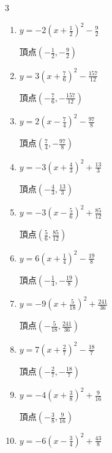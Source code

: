 \begin{multicols}{3}
\begin{enumerate}
        $\displaystyle 頂点\left( \frac{3}{10} , -\frac{29}{20} \right)$

  \item $\displaystyle y=-2\left( x+\frac{1}{2}\right)^{2}-\frac{9}{2}$

        $\displaystyle 頂点\left( -\frac{1}{2} , -\frac{9}{2} \right)$

  \item $\displaystyle y=3\left( x+\frac{7}{6}\right)^{2}-\frac{157}{12}$

        $\displaystyle 頂点\left( -\frac{7}{6} , -\frac{157}{12} \right)$

  \item $\displaystyle y=2\left( x-\frac{7}{4}\right)^{2}-\frac{97}{8}$

        $\displaystyle 頂点\left( \frac{7}{4} , -\frac{97}{8} \right)$

  \item $\displaystyle y=-3\left( x+\frac{4}{3}\right)^{2}+\frac{13}{3}$

        $\displaystyle 頂点\left( -\frac{4}{3} , \frac{13}{3} \right)$

\columnbreak %

  \item $\displaystyle y=-3\left( x-\frac{5}{6}\right)^{2}+\frac{85}{12}$

        $\displaystyle 頂点\left( \frac{5}{6} , \frac{85}{12} \right)$

  \item $\displaystyle y=6\left( x+\frac{1}{4}\right)^{2}-\frac{19}{8}$

        $\displaystyle 頂点\left( -\frac{1}{4} , -\frac{19}{8} \right)$

  \item $\displaystyle y=-9\left( x+\frac{5}{18}\right)^{2}+\frac{241}{36}$

        $\displaystyle 頂点\left( -\frac{5}{18} , \frac{241}{36} \right)$

  \item $\displaystyle y=7\left( x+\frac{2}{7}\right)^{2}-\frac{18}{7}$

        $\displaystyle 頂点\left( -\frac{2}{7} , -\frac{18}{7} \right)$

  \item $\displaystyle y=-4\left( x+\frac{3}{8}\right)^{2}+\frac{9}{16}$

        $\displaystyle 頂点\left( -\frac{3}{8} , \frac{9}{16} \right)$

  \item $\displaystyle y=-6\left( x-\frac{3}{4}\right)^{2}+\frac{43}{8}$


\end{enumerate}
\end{multicols}
